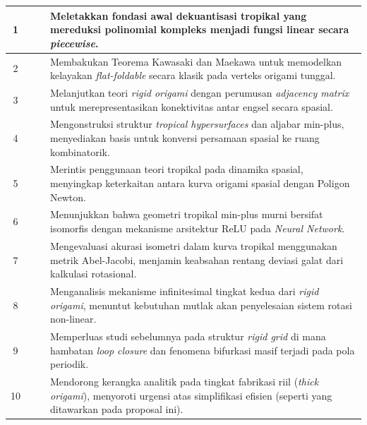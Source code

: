 \begin{longtable}{|c|p{3.2cm}|c|p{8.5cm}|}
  1           & \citeauthor{mikhalkin2006tropical} & \citeyear{mikhalkin2006tropical} & Meletakkan fondasi awal dekuantisasi tropikal yang mereduksi polinomial kompleks menjadi fungsi linear secara \textit{piecewise}.                                          \\
  \hline
  2           & \citeauthor{hull2012project}       & \citeyear{hull2012project}       & Membakukan Teorema Kawasaki dan Maekawa untuk memodelkan kelayakan \textit{flat-foldable} secara klasik pada verteks origami tunggal.                                             \\
  \hline
  3           & \citeauthor{ku2014realization}     & \citeyear{ku2014realization}     & Melanjutkan teori \textit{rigid origami} dengan perumusan \textit{adjacency matrix} untuk merepresentasikan konektivitas antar engsel secara spasial.                                              \\
  \hline
  4           & \citeauthor{maclagan2015tropical}  & \citeyear{maclagan2015tropical}  & Mengonstruksi struktur \textit{tropical hypersurfaces} dan aljabar min-plus, menyediakan basis untuk konversi persamaan spasial ke ruang kombinatorik. \\
  \hline
  5           & \citeauthor{nekrasov2018geometry}  & \citeyear{nekrasov2018geometry}  & Merintis penggunaan teori tropikal pada dinamika spasial, menyingkap keterkaitan antara kurva origami spasial dengan Poligon Newton.                                  \\
  \hline
  6           & \citeauthor{zhang2018tropical}     & \citeyear{zhang2018tropical}     & Menunjukkan bahwa geometri tropikal min-plus murni bersifat isomorfis dengan mekanisme arsitektur ReLU pada \textit{Neural Network}.                                        \\
  \hline
  7           & \citeauthor{foster2020metric}      & \citeyear{foster2020metric}      & Mengevaluasi akurasi isometri dalam kurva tropikal menggunakan metrik Abel-Jacobi, menjamin keabsahan rentang deviasi galat dari kalkulasi rotasional.                                          \\
  \hline
  8           & \citeauthor{hayakawa2023analytical} & \citeyear{hayakawa2023analytical} & Menganalisis mekanisme infinitesimal tingkat kedua dari \textit{rigid origami}, menuntut kebutuhan mutlak akan penyelesaian sistem rotasi non-linear.                         \\
  \hline
  9           & \citeauthor{hayakawa2024rigid}     & \citeyear{hayakawa2024rigid}     & Memperluas studi sebelumnya pada struktur \textit{rigid grid} di mana hambatan \textit{loop closure} dan fenomena bifurkasi masif terjadi pada pola periodik.                             \\
  \hline
  10          & \citeauthor{bershadsky2024framework} & \citeyear{bershadsky2024framework} & Mendorong kerangka analitik pada tingkat fabrikasi riil (\textit{thick origami}), menyoroti urgensi atas simplifikasi efisien (seperti yang ditawarkan pada proposal ini).                      \\
\end{longtable}
\egroup

